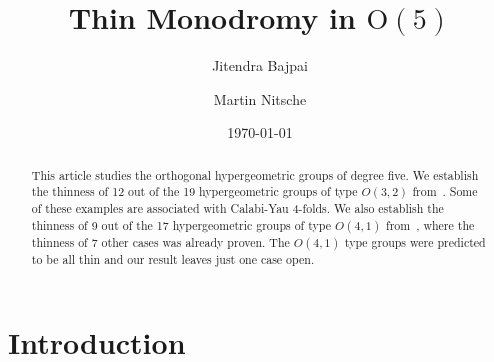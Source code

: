 \documentclass[11pt,a4paper]{amsart}
\theoremstyle{definition}
\theoremstyle{definition}
\numberwithin{equation}{section}
\begin{document}
\date{\today}
\title[Thin Monodromy in  $\mathrm{O}(5)$]{Thin Monodromy in $\mathrm{O}(5)$}
\author{Jitendra Bajpai}
\address{Max Planck Institute for Mathematics, Vivatsgasse 7, 53111 Bonn, Germany}
\author{Martin Nitsche}
\address{Institute of Algebra and Geometry, Karlsruhe Institute of Technology, Germany}


\begin{abstract}
This article studies the orthogonal hypergeometric groups of degree five.
We establish the thinness of 12 out of the 19 hypergeometric groups of type $O(3,2)$ from~\cite[Table~6]{BS}.
Some of these examples are associated with Calabi-Yau 4-folds. 
We also establish the thinness of 9 out of the 17 hypergeometric groups of type $O(4,1)$ from~\cite{FMS}, where the thinness of 7 other cases was already proven. The $O(4,1)$ type groups were predicted to be all thin and our result leaves just one case open.
\end{abstract}

\maketitle


\section{Introduction}
\end{document}
